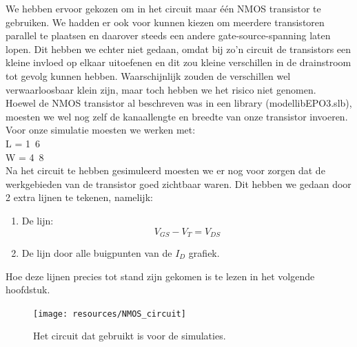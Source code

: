\documentclass{scrartcl}  %
\begin{document}
We hebben ervoor gekozen om in het circuit maar één NMOS transistor te gebruiken. 
We hadden er ook voor kunnen kiezen om meerdere transistoren parallel te plaatsen en daarover steeds een andere gate-source-spanning laten lopen. 
Dit hebben we echter niet gedaan, omdat bij zo'n circuit de transistors een kleine invloed op elkaar uitoefenen en dit zou kleine verschillen in de drainstroom tot gevolg kunnen hebben. 
Waarschijnlijk zouden de verschillen wel verwaarloosbaar klein zijn, maar toch hebben we het risico niet genomen. 
\\
Hoewel de NMOS transistor al beschreven was in een library (modellibEPO3.slb), moesten we wel nog zelf de kanaallengte en breedte van onze transistor invoeren. 
Voor onze simulatie moesten we werken met: \\
L = \unit{1.6}{\micro\meter} \\
W = \unit{4.8}{\micro\meter} \\
Na het circuit te hebben gesimuleerd moesten we er nog voor zorgen dat de werkgebieden van de transistor goed zichtbaar waren. 
Dit hebben we gedaan door 2 extra lijnen te tekenen, namelijk: 
\begin{enumerate}
	\item De lijn: 
\begin{equation}
V_{GS} - V_{T} = V_{DS} 
\end{equation}
	\item De lijn door alle buigpunten van de $I_{D}$ grafiek.
\end{enumerate}
Hoe deze lijnen precies tot stand zijn gekomen is te lezen in het volgende hoofdstuk. 


\begin{figure}[H]
\centering
	\texttt{[image: resources/NMOS\_circuit]}
	\caption{Het circuit dat gebruikt is voor de simulaties.}
	\label{fig:circuit}
\end{figure}
\end{document}
